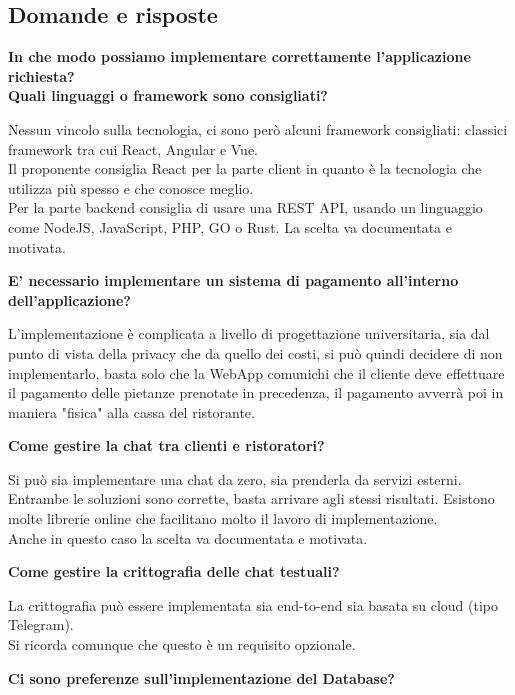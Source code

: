 \documentclass[a4paper, 11pt]{article}
\begin{document}
\subsection{Domande e risposte}

\textbf{In che modo possiamo implementare correttamente l’applicazione richiesta?  \\
Quali linguaggi o framework sono consigliati?}

Nessun vincolo sulla tecnologia, ci sono però alcuni framework consigliati: classici framework tra cui React, Angular e Vue. \\ 
Il proponente consiglia React per la parte client in quanto è la tecnologia che utilizza più spesso e che conosce meglio. \\
Per la parte backend consiglia di usare una REST API, usando un linguaggio come NodeJS, JavaScript, PHP, GO o Rust. La scelta va documentata e motivata.\newline

\textbf{E’ necessario implementare un sistema di pagamento all’interno dell’applicazione?}

L'implementazione è complicata a livello di progettazione universitaria, 
sia dal punto di vista della privacy che da quello dei costi, si può quindi decidere di non implementarlo, basta solo che la WebApp comunichi che il cliente deve effettuare il pagamento delle pietanze prenotate in precedenza, il pagamento avverrà poi in maniera "fisica" alla cassa del ristorante. \newline 

\textbf{Come gestire la chat tra clienti e ristoratori?}

Si può sia implementare una chat da zero, sia prenderla da servizi esterni. Entrambe le soluzioni sono corrette, basta arrivare agli stessi risultati.
Esistono molte librerie online che facilitano molto il lavoro di implementazione. \\
Anche in questo caso la scelta va documentata e motivata.\newline

\textbf{Come gestire la crittografia delle chat testuali?}

La crittografia può essere implementata sia end-to-end sia basata su cloud (tipo Telegram). \\
Si ricorda comunque che questo è un requisito opzionale.\newline

\textbf{Ci sono preferenze sull'implementazione del Database?}
\end{document}

